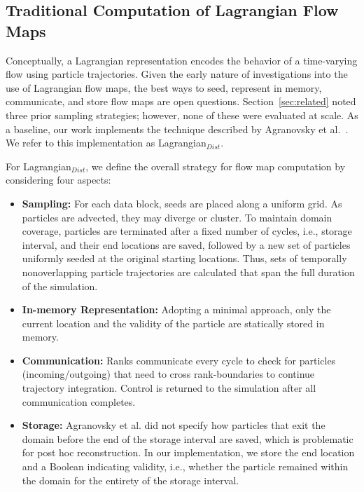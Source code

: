 

\subsection{Traditional Computation of Lagrangian Flow Maps}
\label{sec:baseline}
Conceptually, a Lagrangian representation encodes the behavior of a time-varying flow using particle trajectories.
%
Given the early nature of investigations into the use of Lagrangian flow maps, the best ways to seed, represent in memory, communicate, and store flow maps are open questions. 
%
%
Section~\ref{sec:related} noted three prior sampling strategies; however, none of these were evaluated at scale.
%
As a baseline, our work implements the technique described by Agranovsky et al.~\cite{agranovsky2014improved}. 
%
We refer to this implementation as Lagrangian$_{Dist}$.

For Lagrangian$_{Dist}$, we define the overall strategy for flow map computation by considering four aspects:
%
\begin{itemize}[leftmargin=*]
\item\textbf{Sampling:} For each data block, seeds are placed along a uniform grid. As particles are advected, they may diverge or cluster. 
%
To maintain domain coverage, particles are terminated after a fixed number of cycles, i.e., storage interval, and their end locations are saved, followed by a new set of particles uniformly seeded at the original starting locations.
%
Thus, sets of temporally nonoverlapping particle trajectories are calculated that span the full duration of the simulation.
%
\item\textbf{In-memory Representation:} %
%
Adopting a minimal approach, only the current location and the validity of the particle are statically stored in memory. 
%
\item\textbf{Communication:} Ranks communicate every cycle to check for particles (incoming/outgoing) that need to cross rank-boundaries to continue trajectory integration. 
%
Control is returned to the simulation after all communication completes.
\item\textbf{Storage:} Agranovsky et al. did not specify how particles that exit the domain before the end of the storage interval are saved,
%
which is problematic for post hoc reconstruction. 
%
In our implementation, we store the end location and a Boolean indicating validity, i.e., whether the particle remained within the domain for the entirety of the storage interval. 
%
%
\end{itemize}

